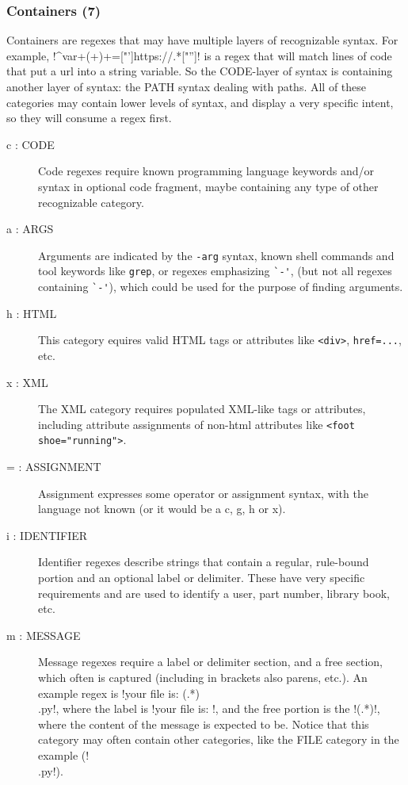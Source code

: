 \subsubsection{Containers (7)}
Containers are regexes that may have multiple layers of recognizable syntax.  For example, \cverb!^var\s+(\w+)\s+=["']https://.*["'']! is a regex that will match lines of code that put a url into a string variable.  So the CODE-layer of syntax is containing another layer of syntax: the PATH syntax dealing with paths.  All of these categories may contain lower levels of syntax, and display a very specific intent, so they will consume a regex first.
\begin{description}
\item[ c : CODE ] Code regexes require known programming language keywords and/or syntax in optional code fragment, maybe containing any type of other recognizable category.
\item[ a : ARGS ] Arguments are indicated by the \verb!-arg! syntax, known shell commands and tool keywords like \verb!grep!, or regexes emphasizing \verb!`-'!, (but not all regexes containing \verb!`-'!), which could be used for the purpose of finding arguments.
\item[ h : HTML ] This category equires valid HTML tags or attributes like \verb!<div>!,  \verb!href=...!, etc.
\item[ x : XML ] The XML category requires populated XML-like tags or attributes, including attribute assignments of non-html attributes like \verb!<foot shoe="running">!.
\item[ = : ASSIGNMENT ] Assignment expresses some operator or assignment syntax, with the language not known (or it would be a c, g, h or x).
\item[ i : IDENTIFIER ] Identifier regexes describe strings that contain a regular, rule-bound portion and an optional label or delimiter.  These have very specific requirements and are used to identify a user, part number, library book, etc.
\item[ m : MESSAGE ] Message regexes require a label or delimiter section, and a free section, which often is captured (including in brackets also parens, etc.).  An example regex is \cverb!your file is: (.*)\\.py!, where the label is \cverb!your file is: !, and the free portion is the \cverb!(.*)!, where the content of the message is expected to be.  Notice that this category may often contain other categories, like the FILE category in the example (\cverb!\\.py!).
\end{description}

